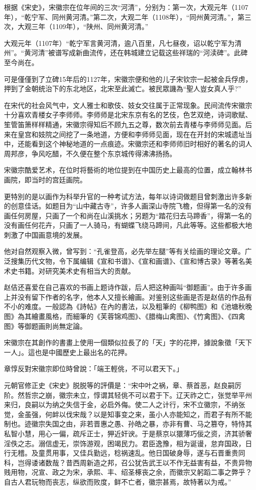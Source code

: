 根据《宋史》，宋徽宗在位年间的三次“河清”，分别为：第一次，大观元年（1107年），“乾宁军、同州黄河清。”第二次，大观二年（1108年），“同州黄河清。”，第三次，大观三年（1109年），“陕州、同州黄河清。”

大观元年（1107年）“乾宁军言黄河清，逾八百里，凡七昼夜，诏以乾宁军为清州”。“黄河清”被谱写成新曲流传，还在韩城建立记载这些祥瑞的“河渎碑”。此碑至今尚在。

可是僅僅到了立碑15年后的1127年，宋徽宗便和他的儿子宋钦宗一起被金兵俘虏，押到了金朝统治下的东北地区，北宋至此滅亡。被民眾譏為“聖人豈女真人乎?”

在宋代的社会风气中，文人雅士和歌伎、妓女交往属于正常现象。民间流传宋徽宗十分喜欢青楼女子李师师。李师师是北宋东京有名的艺伎，色艺双绝，诗词歌赋、笙管笛箫样样精通，宋徽宗得知后不顾九五之尊，数次前去青楼与李师师见面。后来在皇宫和妓院之间挖了一条地道，方便和李师师见面，现在在开封的宋城遗址当中，还能看到这个神秘地道的一点痕迹。宋徽宗还和李师师旧时相好的著名的词人周邦彦，争风吃醋，不久便在整个东京城传得沸沸扬扬。

宋徽宗酷爱艺术，在位时将藝術的地位提到在中国历史上最高的位置，成立翰林书画院，即当时的宫廷画院。

更特別的是以画作为科举升官的一种考试方法，每年以诗词做题目曾刺激出许多新的创意佳话。如题目为“山中藏古寺”，许多人画深山寺院飞檐，但得第一名的没有画任何房屋，只画了一个和尚在山溪挑水；另题为“踏花归去马蹄香”，得第一名的没有画任何花卉，只画了一人骑马，有蝴蝶飞绕马蹄间，凡此等等。这些都极大地刺激了中国画意境的发展。

他对自然观察入微，曾写到：“孔雀登高，必先举左腿”等有关绘画的理论文章。广泛搜集历代文物，令下属编辑《宣和书谱》、《宣和画谱》、《宣和博古录》等著名美术史书籍。对研究美术史有相当大的贡献。

赵佶还喜爱在自己喜欢的书画上题诗作跋，后人把这种画叫“御题画”。由于许多画上并没有留下作者的名字，他本人又擅长繪画。对鉴别这些画是否是赵佶的作品有不小的难度。一般認為《詩帖》在內的書法，以及粗筆的《柳鸭图》和《池塘秋晚图》為其繪畫風格，而細筆的《芙蓉锦鸡图》、《腊梅山禽图》、《竹禽图》、《四禽图》等御题画則尚無定論。

宋徽宗在其創作的書畫上使用一個類似拉長了的「天」字的花押，據說象徵「天下一人」。這也是中國歷史上最出名的花押。

章惇反對宋徽宗即位時曾說：「端王輕佻，不可以君天下。」

元朝官修正史《宋史》脱脱等的評價是：“宋中叶之祸，章、蔡首恶，赵良嗣厉阶。然哲宗之崩，徽宗未立，惇谓其轻佻不可以君于下。辽天祚之亡，张觉举平州来归，良嗣以为纳之失信于金，必启外侮。使二人之计行，宋不立徽宗，不纳张觉，金虽强，何衅以伐宋哉？以是知事变之来，虽小人亦能知之，而君子有所不能制也。迹徽宗失国之由，非若晋惠之愚、孙皓之暴，亦非有曹、马之篡夺，特恃其私智小慧，用心一偏，疏斥正士，狎近奸谀。于是蔡京以獧薄巧佞之资，济其骄奢淫佚之志。溺信虚无，崇饰游观，困竭民力。君臣逸豫，相为诞谩，怠弃国政，日行无稽。及童贯用事，又佳兵勤远，稔祸速乱。他日国破身辱，遂与石晋重贵同科，岂得诿诸数哉？昔西周新造之邦，召公犹告武王以不作无益害有益，不贵异物贱用物，况宣、政之为宋，承熙、丰、绍圣椓丧之余，而徽宗又躬蹈二事之弊乎？自古人君玩物而丧志，纵欲而败度，鲜不亡者，徽宗甚焉，故特著以为戒。”

